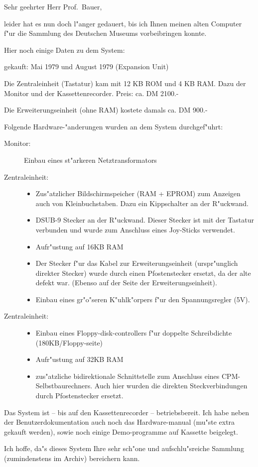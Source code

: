 Sehr geehrter Herr Prof.~Bauer,

leider hat es nun doch l"anger gedauert, bis ich
Ihnen meinen alten Computer f"ur die Sammlung des
Deutschen Museums vorbeibringen konnte.

Hier noch einige Daten zu dem System:

gekauft: Mai 1979 und August 1979 (Expansion Unit)

Die Zentraleinheit (Tastatur) kam mit 12 KB ROM und 4 KB RAM.
Dazu der Monitor und der Kassettenrecorder.
Preis: ca. DM 2100.-

Die Erweiterungseinheit (ohne RAM) kostete damals ca. DM 900.-

Folgende Hardware-"anderungen wurden an dem System durchgef"uhrt:
\begin{description}
\item[Monitor:]
Einbau eines st"arkeren Netztransformators
\item[Zentraleinheit:]
\begin{itemize}
	\item
	Zus"atzlicher Bildschirmspeicher (RAM + EPROM) zum Anzeigen auch von
	Kleinbuchstaben. Dazu ein Kippschalter an der R"uckwand.
	\item
	DSUB-9 Stecker an der R"uckwand. Dieser Stecker ist mit der
	Tastatur verbunden und wurde zum Anschluss eines Joy-Sticks
	verwendet.
	\item
	Aufr"ustung auf 16KB RAM
	\item
	Der Stecker f"ur das Kabel zur Erweiterungseinheit (urspr"unglich
	direkter Stecker) wurde durch einen Pfostenstecker ersetzt, da
	der alte defekt war. (Ebenso auf der Seite der Erweiterungseinheit).
	\item
	Einbau eines gr"o"seren K"uhlk"orpers f"ur den Spannungsregler
	(5V).
\end{itemize}
\item[Zentraleinheit:]
\begin{itemize}
	\item
	Einbau eines Floppy-disk-controllers f"ur doppelte
	Schreibdichte (180KB/Floppy-seite)
	\item
	Aufr"ustung auf 32KB RAM
	\item
	zus"atzliche bidirektionale Schnittstelle zum Anschluss
	eines CPM-Selbstbaurechners. Auch hier wurden die direkten
	Steckverbindungen durch Pfostenstecker ersetzt.
\end{itemize}
\end{description}

Das System ist -- bis auf den Kassettenrecorder -- betriebsbereit.
Ich habe neben der Benutzerdokumentation auch noch das Hardware-manual
(mu"ste extra gekauft werden), sowie noch einige Demo-programme auf
Kassette beigelegt.

Ich hoffe, da"s dieses System Ihre sehr sch"one und aufschlu"sreiche
Sammlung (zumindenstens im Archiv) bereichern kann.


